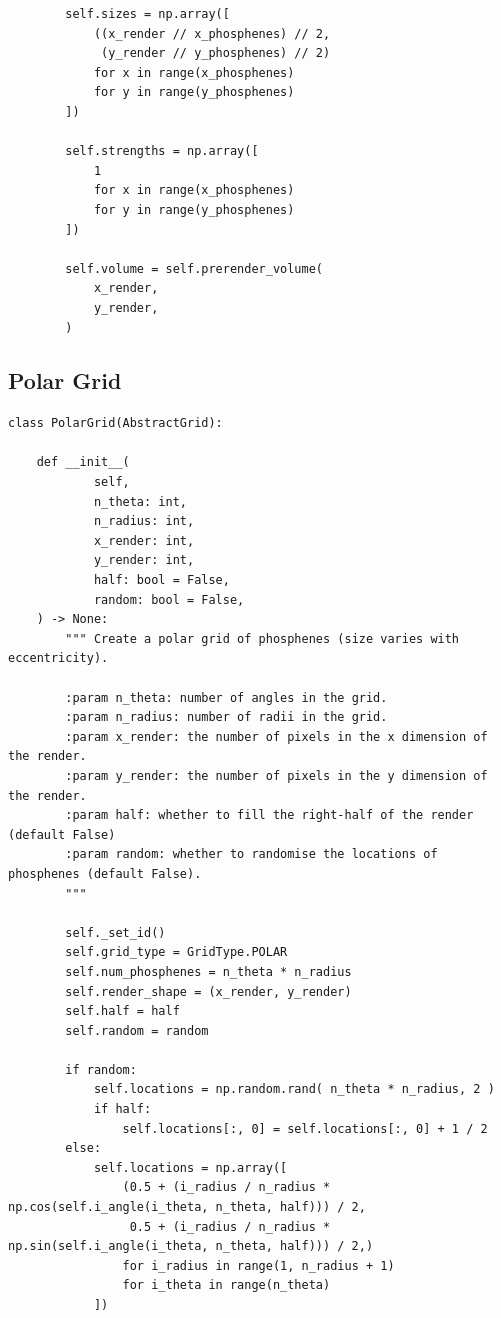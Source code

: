 \documentclass[a4paper,11pt,openany]{book}
\begin{document}
\begin{appendices}
\begin{footnotesize}
\begin{verbatim}
        self.sizes = np.array([
            ((x_render // x_phosphenes) // 2,
             (y_render // y_phosphenes) // 2)
            for x in range(x_phosphenes)
            for y in range(y_phosphenes)
        ])

        self.strengths = np.array([
            1
            for x in range(x_phosphenes)
            for y in range(y_phosphenes)
        ])

        self.volume = self.prerender_volume(
            x_render,
            y_render,
        )

\end{verbatim}
\end{footnotesize}

\subsection*{Polar Grid}
\label{sec:org445c191}
\label{org9b90117}

\begin{footnotesize}
\begin{verbatim}
class PolarGrid(AbstractGrid):

    def __init__(
            self,
            n_theta: int,
            n_radius: int,
            x_render: int,
            y_render: int,
            half: bool = False,
            random: bool = False,
    ) -> None:
        """ Create a polar grid of phosphenes (size varies with eccentricity).

        :param n_theta: number of angles in the grid.
        :param n_radius: number of radii in the grid.
        :param x_render: the number of pixels in the x dimension of the render.
        :param y_render: the number of pixels in the y dimension of the render.
        :param half: whether to fill the right-half of the render (default False)
        :param random: whether to randomise the locations of phosphenes (default False).
        """

        self._set_id()
        self.grid_type = GridType.POLAR
        self.num_phosphenes = n_theta * n_radius
        self.render_shape = (x_render, y_render)
        self.half = half
        self.random = random

        if random:
            self.locations = np.random.rand( n_theta * n_radius, 2 )
            if half:
                self.locations[:, 0] = self.locations[:, 0] + 1 / 2
        else:
            self.locations = np.array([
                (0.5 + (i_radius / n_radius * np.cos(self.i_angle(i_theta, n_theta, half))) / 2,
                 0.5 + (i_radius / n_radius * np.sin(self.i_angle(i_theta, n_theta, half))) / 2,)
                for i_radius in range(1, n_radius + 1)
                for i_theta in range(n_theta)
            ])


\end{verbatim}
\end{footnotesize}
\end{appendices}
\end{document}
